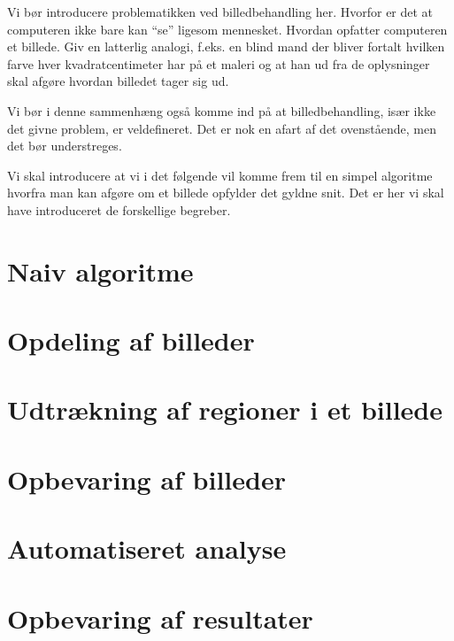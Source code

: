 {
{\sffamily Vi bør introducere problematikken ved billedbehandling her.
Hvorfor er det at computeren ikke bare kan ``se'' ligesom mennesket.
Hvordan opfatter computeren et billede. Giv en latterlig analogi, f.eks.
en blind mand der bliver fortalt hvilken farve hver kvadratcentimeter
har på et maleri og at han ud fra de oplysninger skal afgøre hvordan
billedet tager sig ud.

Vi bør i denne sammenhæng også komme ind på at billedbehandling, især
ikke det givne problem, er veldefineret. Det er nok en afart af det
ovenstående, men det bør understreges.

Vi skal introducere at vi i det følgende vil komme frem til en simpel
algoritme hvorfra man kan afgøre om et billede opfylder det gyldne snit.
Det er her vi skal have introduceret de forskellige begreber.
}

\section{Naiv algoritme\label{naiv_algoritme}}


\section{Opdeling af billeder}


\section{Udtrækning af regioner i et billede}


\section{Opbevaring af billeder\label{section_opbv_billeder}}


\section{Automatiseret analyse}


\section{Opbevaring af resultater\label{section_results}}


}

